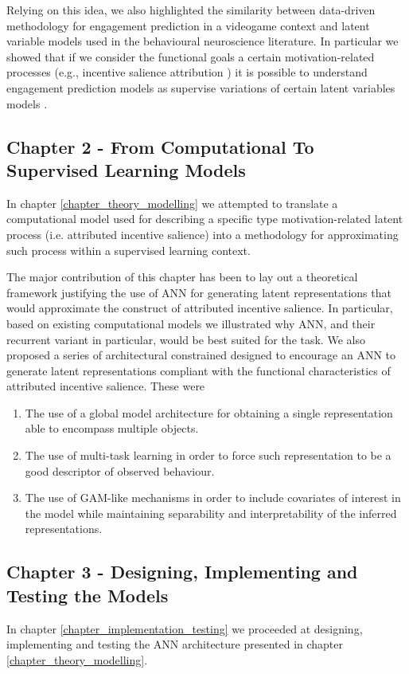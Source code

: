 Relying on this idea, we also highlighted the similarity between data-driven methodology for engagement prediction in a videogame context and latent variable models used in the behavioural neuroscience literature. In particular we showed that if we consider the functional goals a certain motivation-related processes (e.g., incentive salience attribution \cite{berridge2004motivation}) it is possible to understand engagement prediction models as supervise variations of certain latent variables models \cite{luxem2020identifying, mccullough2021unsupervised}.

\subsection{Chapter 2 - From Computational To Supervised Learning Models}
\label{discussion_chapter_two}
In chapter \ref{chapter_theory_modelling} we attempted to translate a computational model used for describing a specific type motivation-related latent process (i.e. attributed incentive salience) into a methodology for approximating such process within a supervised learning context.

The major contribution of this chapter has been to lay out a theoretical framework justifying the use of ANN for generating latent representations that would approximate the construct of attributed incentive salience. In particular, based on existing computational models \cite{mcclure2003computational, zhang2009neural} we illustrated why ANN, and their recurrent variant in particular, would be best suited for the task. We also proposed a series of architectural constrained designed  to encourage an ANN to generate latent representations compliant with the functional characteristics of attributed incentive salience. These were

\begin{enumerate}
    \item The use of a global model architecture for obtaining a single representation able to encompass multiple objects.
    \item The use of multi-task learning in order to force such representation to be a good descriptor of observed behaviour.
    \item The use of GAM-like mechanisms in order to include covariates of interest in the model while maintaining separability and interpretability of the inferred representations.
\end{enumerate}

\subsection{Chapter 3 - Designing, Implementing and Testing the Models }
\label{discussion_chapter_three}
In chapter \ref{chapter_implementation_testing} we proceeded at designing, implementing and testing the ANN architecture presented in chapter \ref{chapter_theory_modelling}.

